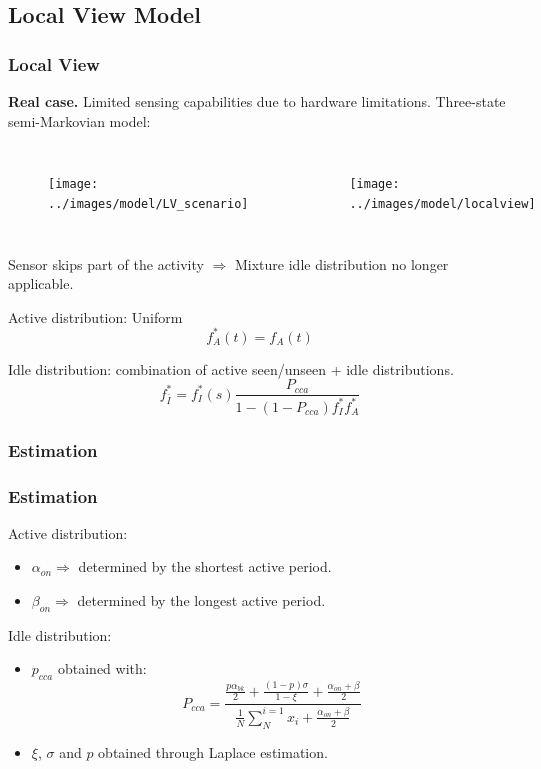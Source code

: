 \documentclass[9pt,handout,serif]{beamer}
\begin{document}
\subsection{Local View Model}
\begin{frame}[c]
	\frametitle{Local View}
	\textbf{Real case.} Limited sensing capabilities due to hardware limitations.	
	Three-state semi-Markovian model:
	\begin{columns}[c]
			\begin{figure}
				\texttt{[image: ../images/model/LV\_scenario]}
			\end{figure}
			\begin{figure}
				\texttt{[image: ../images/model/localview]}
			\end{figure}
	\end{columns}
	
	Sensor skips part of the activity $\Rightarrow$ Mixture idle distribution no longer applicable.
	
	Active distribution: Uniform
	\begin{equation}
		f_A^{*}(t) = f_A(t)
	\end{equation}

	Idle distribution: combination of active seen/unseen + idle distributions.
	\begin{equation}
		f_{\bar{I}}^{*}=f_I^{*}(s)\frac{P_{cca}}{1-(1-P_{cca})f_I^{*}f_A^{*}}
	\end{equation}
	
\end{frame}

\subsubsection*{Estimation}
\begin{frame}[c]
	\frametitle{Estimation}
	Active distribution:
	\begin{itemize}
		\item $\alpha_{on} \Rightarrow$ determined by the shortest active period.
		\item $\beta_{on} \Rightarrow$ determined by the longest active period.
	\end{itemize}
	
	\vspace{0.2in}
	Idle distribution:\\
	\begin{itemize}
		\item $p_{cca}$ obtained with:
		\begin{equation}
			P_{cca} = \frac{\frac{p\alpha_{bk}}{2}+\frac{(1-p)\sigma}{1-\xi}+\frac{\alpha_{on}+\beta}{2}}{\frac{1}{N}\sum_{N}^{i=1}x_i+\frac{\alpha_{on}+\beta}{2}}
		\end{equation}
		\item $\xi$, $\sigma$ and $p$ obtained through Laplace estimation.
	\end{itemize}
\end{frame}
\end{document}
